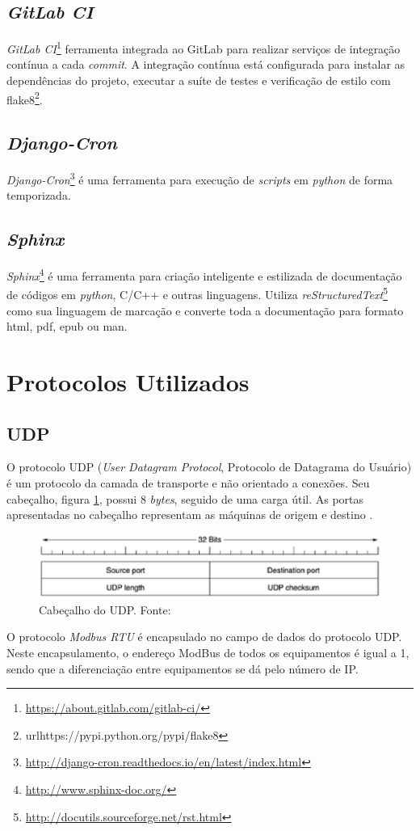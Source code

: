     \subsection{\textit{GitLab CI}}
    \textit{GitLab CI}\footnote{\url{https://about.gitlab.com/gitlab-ci/}} ferramenta integrada ao {GitLab} para realizar serviços de integração contínua a cada \textit{commit}. A integração contínua está configurada para instalar as dependências do projeto, executar a suíte de testes e verificação de estilo com flake8\footnote{url{https://pypi.python.org/pypi/flake8}}.

    \subsection{\textit{Django-Cron}}
    \textit{Django-Cron}\footnote{\url{http://django-cron.readthedocs.io/en/latest/index.html}} é uma ferramenta para execução de \textit{scripts} em \textit{python} de forma temporizada.

    \subsection{\textit{Sphinx}}
    \textit{Sphinx}\footnote{\url{http://www.sphinx-doc.org/}} é uma ferramenta para criação inteligente e estilizada de documentação de códigos em \textit{python}, C/C++
    e outras linguagens. Utiliza \textit{reStructuredText}\footnote{\url{http://docutils.sourceforge.net/rst.html}} como sua linguagem de marcação e converte toda a documentação para formato html, pdf, epub ou man.

\section{Protocolos Utilizados}    

    \subsection{UDP}
    O protocolo UDP (\textit{User Datagram Protocol}, Protocolo de Datagrama do Usuário) é um protocolo da camada de transporte e não orientado a conexões. Seu cabeçalho, figura \ref{udp_header}, possui 8 \textit{bytes}, seguido de uma carga útil. As portas apresentadas no cabeçalho representam as máquinas de origem e destino \cite{tanenbaum_2002}.

    \begin{figure}[!htpb]
        \centering
        \includegraphics[keepaspectratio=true,scale=0.8]{figuras/udp_header.eps}
        \caption{Cabeçalho do UDP. Fonte: \cite{tanenbaum_2002}}
        \label{udp_header}
    \end{figure}

    O protocolo \textit{Modbus RTU} é encapsulado no campo de dados do protocolo UDP. Neste encapsulamento, o endereço ModBus de todos os equipamentos é igual a 1, sendo que a diferenciação entre equipamentos se dá pelo número de IP.